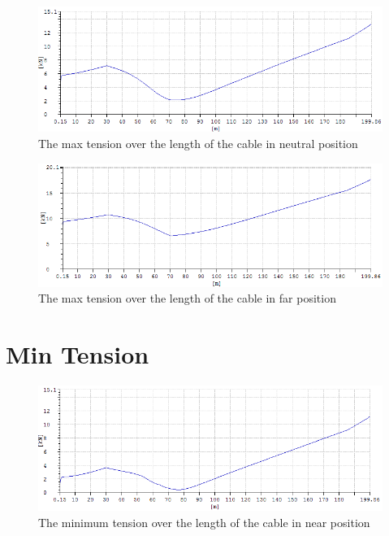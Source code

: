 \begin{figure}[H]
\centering
\includegraphics[scale=0.5]{figures/fmaxneu}
\caption{The max tension over the length of the cable in neutral position}
 \label{fig:fmaxneu}
\end{figure}


\begin{figure}[H]
\centering
\includegraphics[scale=0.5]{figures/fmaxfar}
\caption{The max tension over the length of the cable in far position}
 \label{fig:fmaxfar}
\end{figure}

\section{Min Tension}

\begin{figure}[H]
\centering
\includegraphics[scale=0.5]{figures/fminnear}
\caption{The minimum tension over the length of the cable in near position}
 \label{fig:fminnear}
\end{figure}


